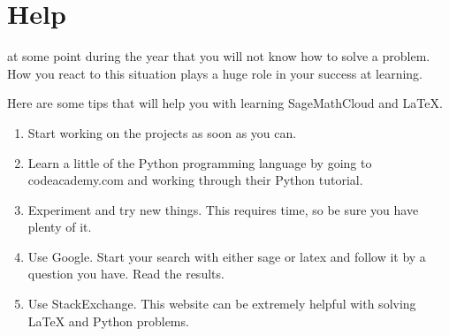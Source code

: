 \documentclass
[justified,nohyper]
{tufte-handout}
\begin{document}
\section{Help}

 at some point during the year that you will not know how to solve a problem. How you react to this situation plays a huge role in your success at learning.

Here are some tips that will help you with learning SageMathCloud and \LaTeX.

\begin{enumerate}
  \item Start working on the projects as soon as you can.
  \item Learn a little of the Python programming language by going to codeacademy.com and working through their Python tutorial.
  \item Experiment and try new things. This requires time, so be sure you have plenty of it.
  \item Use Google. Start your search with either sage or latex and follow it by a question you have. Read the results.
  \item Use StackExchange. This website can be extremely helpful with solving \LaTeX\; and Python problems.
\end{enumerate}
\end{document}
